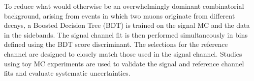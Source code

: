 To reduce what would otherwise be an overwhelmingly dominant combinatorial background, arising from events in which two muons originate from different \bquark decays, a Boosted Decision Tree (BDT) is trained on the signal MC and the data in the sidebands. 
The signal channel fit is then performed simultaneously in bins defined using the BDT score discriminant. 
The selections for the reference channel are designed to closely match those used in the signal channel.  
Studies using toy MC experiments are used to validate the signal and reference channel fits and evaluate systematic uncertainties. 
